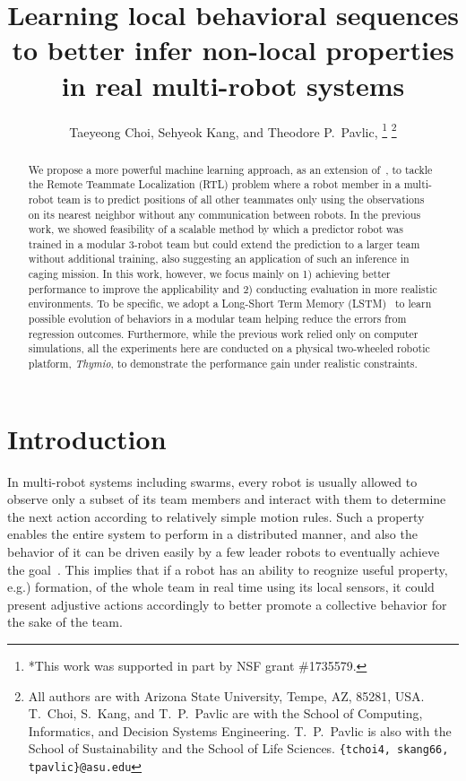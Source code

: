 \documentclass[letterpaper, 10 pt, conference]{ieeeconf}  %
\title{\LARGE \bf
	Learning local behavioral sequences
	to better infer non-local properties in real multi-robot systems
}
\author{Taeyeong Choi, Sehyeok Kang, and Theodore P.~Pavlic, \IEEEmembership{Member, IEEE} %
    \thanks{*This work was supported in part by NSF grant \#1735579.}%
    \thanks{All authors are with Arizona State University, Tempe, AZ,
        85281, USA. T.~Choi, S.~Kang, and T.~P.~Pavlic are with the
        School of Computing, Informatics, and Decision Systems
        Engineering. T.~P.~Pavlic is also with the School of
        Sustainability and the School of Life Sciences.
        {\tt\small \{tchoi4, skang66, tpavlic\}@asu.edu}}%
}
\begin{document}
	\maketitle
	\thispagestyle{empty}
	\pagestyle{empty}


	\begin{abstract}

		We propose a more powerful machine learning approach, as an extension of~\cite{CPR17},
		to tackle the Remote Teammate
		Localization (RTL) problem where a robot member in a multi-robot team is to predict positions
		of all other teammates only using the observations on its nearest neighbor without any
		communication between robots.
		In the previous work, we showed feasibility of a scalable method by which
		a predictor robot was trained in a modular 3-robot team but could extend the prediction
		to a larger
		team without additional training, also suggesting an application of such an inference in
		caging mission.
		In this work, however, we focus mainly on 1) achieving better performance
		to improve the applicability and 2) conducting evaluation in
		more realistic environments. To be specific, we adopt a Long-Short Term Memory (LSTM)~\cite{HS97}
		to learn possible evolution of behaviors in a modular team helping reduce the errors
		from regression outcomes. Furthermore, while the previous work relied only on computer simulations,
		all the experiments here are conducted on a physical two-wheeled robotic platform, \emph{Thymio},
		to demonstrate the performance gain under realistic constraints.

	\end{abstract}



	\section{Introduction}
	\label{sec:intro}

	In multi-robot systems including swarms, every robot is usually allowed to observe
	only a subset of its team members and interact with them to determine the next action
	according to relatively simple motion rules.
	Such a property enables the entire system to perform in a distributed manner, and
	also the behavior of it can be driven easily by a few leader robots to
	eventually achieve the goal~\cite{CPR17, DGRSS17, EB16, Stern18}.
	This implies that if a robot has an ability to reognize useful property, e.g.) formation,
	of the whole team in real time using its local sensors,
	it could present adjustive actions accordingly to better promote a collective behavior
	for the sake of the team.
\end{document}
